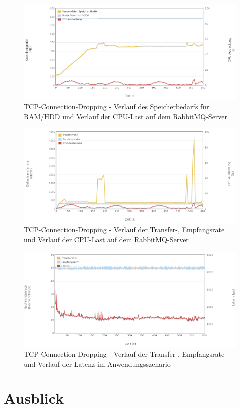 \documentclass[	a4paper,
			11pt,
			oneside,
			parskip]{scrartcl}
\begin{document}
		\begin{figure}[!htb]
			\centering
			\includegraphics[width=\textwidth]{img/tcpdrop/tcpdrop_server1.png}
			\caption{TCP-Connection-Dropping - Verlauf des Speicherbedarfs für RAM/HDD und Verlauf der CPU-Last auf dem RabbitMQ-Server}
			\label{fig:tcpdrop-server1}
		\end{figure}
		
		\begin{figure}[!htb]
			\centering
			\includegraphics[width=\textwidth]{img/tcpdrop/tcpdrop_server2.png}
			\caption{TCP-Connection-Dropping - Verlauf der Transfer-, Empfangsrate und Verlauf der CPU-Last auf dem RabbitMQ-Server}
			\label{fig:tcpdrop-server2}
		\end{figure}
		
		\begin{figure}[!htb]
			\centering
			\includegraphics[width=\textwidth]{img/tcpdrop/tcpdrop_scenario.png}
			\caption{TCP-Connection-Dropping - Verlauf der Transfer-, Empfangsrate und Verlauf der Latenz im Anwendungsszenario}
			\label{fig:tcpdrop-scenario}
		\end{figure}
		
		
\clearpage
\section*{Ausblick}
\end{document}
